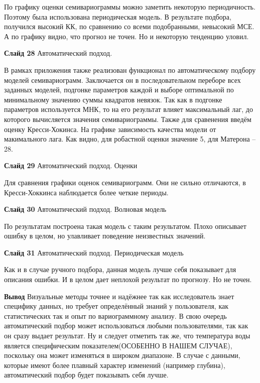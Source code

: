 \documentclass[a4paper,10pt]{report}
\begin{document}
По графику оценки семивариограммы можно заметить некоторую периодичность. Поэтому была использована периодическая модель. В результате подбора, получился высокий КК, по сравнению со всеми подобранными, невысокий МСЕ. А по графику видно, что прогноз не точен. Но и некоторую тенденцию уловил.

\textbf{Слайд 28} Автоматический подход.

В рамках приложения также реализован функционал по автоматическому подбору моделей семивариограмм. Заключается он в последовательном переборе всех заданных моделей, подгонке параметров каждой и выборе оптимальной по минимальному значению суммы квадратов невязок. Так как в подгонке параметров используется МНК, то на его результат влияет максимальный лаг, до которого вычисляется значения семивариограммы. Также для сравенения введём оценку Кресси-Хокинса. На графике зависимость качества модели от макимального лага. Как видно, для робастной оценки значение 5, для Матерона -- 28.

\textbf{Слайд 29} Автоматический подход. Оценки

Для сравнения графики оценок семивариограмм. Они не сильно отличаются, в Кресси-Хоккинса наблюдается более четкие периоды.

\textbf{Слайд 30} Автоматический подход. Волновая модель

По результатам построена такая модель с таким результатом. Плохо описывает ошибку в целом, но улавливает поведение неизвестных значений.

\textbf{Слайд 31} Автоматический подход. Периодическая модель

Как и в случае ручного подбора, данная модель лучше себя показывает для описания ошибки. И в целом дает неплохой результат по прогнозу. Но не точен.

\textbf{Вывод} Визуальные методы точнее и надёжнее так как исследователь знает специфику данных, но требует определённый знаний у пользователя, как статистических так и опыт по вариограммному анализу. В свою очередь автоматический подбор может использоваться любыми пользователями, так как он сразу выдает результат. Ну и следует отметить так же, что температура воды является специфическим показателем(ОСОБЕННО В НАШЕМ СЛУЧАЕ), поскольку она может изменяться в широком диапазоне. В случае с данными, которые имеют более плавный характер изменений (например глубина), автоматический подбор будет показывать себя лучше.
\end{document}
